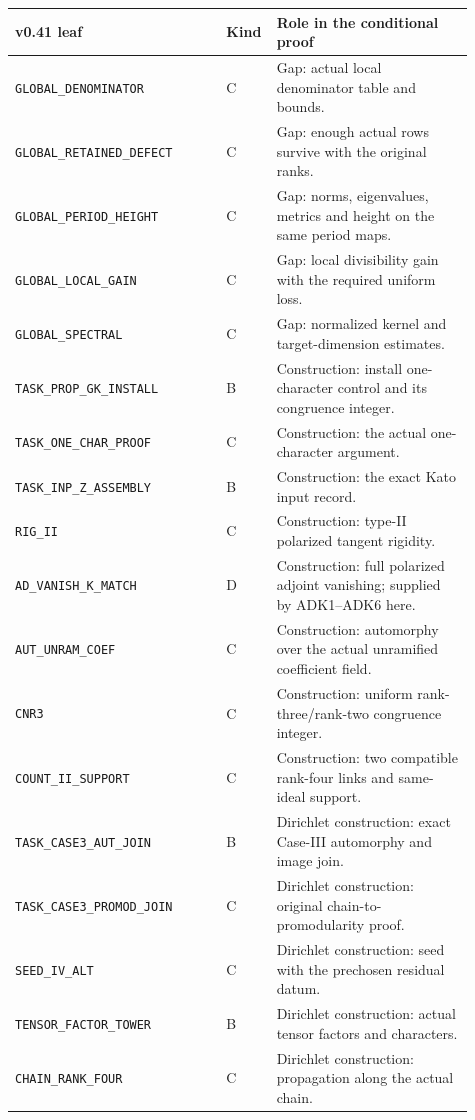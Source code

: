 \begin{longtable}{p{0.44\linewidth}p{0.06\linewidth}p{0.41\linewidth}}
\textbf{v0.41 leaf} & \textbf{Kind} & \textbf{Role in the conditional proof}\\\hline
\endhead
\texttt{GLOBAL\_DENOMINATOR} & C & Gap: actual local denominator table and bounds.\\
\texttt{GLOBAL\_RETAINED\_DEFECT} & C & Gap: enough actual rows survive with the original ranks.\\
\texttt{GLOBAL\_PERIOD\_HEIGHT} & C & Gap: norms, eigenvalues, metrics and height on the same period maps.\\
\texttt{GLOBAL\_LOCAL\_GAIN} & C & Gap: local divisibility gain with the required uniform loss.\\
\texttt{GLOBAL\_SPECTRAL} & C & Gap: normalized kernel and target-dimension estimates.\\
\texttt{TASK\_PROP\_GK\_INSTALL} & B & Construction: install one-character control and its congruence integer.\\
\texttt{TASK\_ONE\_CHAR\_PROOF} & C & Construction: the actual one-character argument.\\
\texttt{TASK\_INP\_Z\_ASSEMBLY} & B & Construction: the exact Kato input record.\\
\texttt{RIG\_II} & C & Construction: type-II polarized tangent rigidity.\\
\texttt{AD\_VANISH\_K\_MATCH} & D & Construction: full polarized adjoint vanishing; supplied by ADK1--ADK6 here.\\
\texttt{AUT\_UNRAM\_COEF} & C & Construction: automorphy over the actual unramified coefficient field.\\
\texttt{CNR3} & C & Construction: uniform rank-three/rank-two congruence integer.\\
\texttt{COUNT\_II\_SUPPORT} & C & Construction: two compatible rank-four links and same-ideal support.\\
\texttt{TASK\_CASE3\_AUT\_JOIN} & B & Dirichlet construction: exact Case-III automorphy and image join.\\
\texttt{TASK\_CASE3\_PROMOD\_JOIN} & C & Dirichlet construction: original chain-to-promodularity proof.\\
\texttt{SEED\_IV\_ALT} & C & Dirichlet construction: seed with the prechosen residual datum.\\
\texttt{TENSOR\_FACTOR\_TOWER} & B & Dirichlet construction: actual tensor factors and characters.\\
\texttt{CHAIN\_RANK\_FOUR} & C & Dirichlet construction: propagation along the actual chain.\\

\end{longtable}
